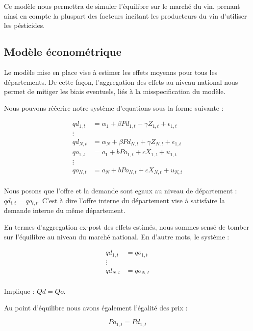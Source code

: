 \documentclass[11pt,]{article}
\begin{document}
Ce modèle nous permettra de simuler l'équilibre sur le marché du vin,
prenant ainsi en compte la pluspart des facteurs incitant les
producteurs du vin d'utiliser les pésticides.

\hypertarget{modele-econometrique}{%
\subsection{Modèle économétrique}\label{modele-econometrique}}

Le modèle mise en place vise à estimer les effets moyenns pour tous les
départements. De cette façon, l'aggregation des effets au niveau
national nous permet de mitiger les biais eventuels, liés à la
misspecification du modèle.

Nous pouvons réécrire notre système d'equations sous la forme suivante :

\begin{align*}
  qd_{1,t} & = \alpha_{1} + \beta Pd_{1,t} + \gamma Z_{1,t} + \epsilon_{1,t}  \\
  \vdots \\ 
  qd_{N,t} & = \alpha_{N} + \beta Pd_{N,t} + \gamma Z_{N,t} + \epsilon_{1,t}  \\
  qo_{1,t} & = a_1 + b Po_{1,t} + c X_{1,t} + u_{1,t} \\ 
  \vdots \\ 
  qo_{N,t} & = a_N + b Po_{N,t} + c X_{N,t} + u_{N,t} \\
\end{align*}

Nous posons que l'offre et la demande sont egaux au niveau de
département : \(qd_{i,t} = qo_{i,t}\). C'est à dire l'offre interne du
département vise à satisfaire la demande interne du même département.

En termes d'aggregation ex-post des effets estimés, nous sommes sensé de
tomber sur l'équilibre au niveau du marché national. En d'autre mots, le
système :

\begin{align*}
  qd_{1,t} & = qo_{1,t} \\
  \vdots \\ 
  qd_{N,t} & = qo_{N,t} \\
\end{align*}

Implique : \(Qd = Qo\).

Au point d'équilibre nous avons également l'égalité des prix :

\begin{equation*}
  Po_{1,t} = Pd_{1,t}
\end{equation*}
\end{document}
